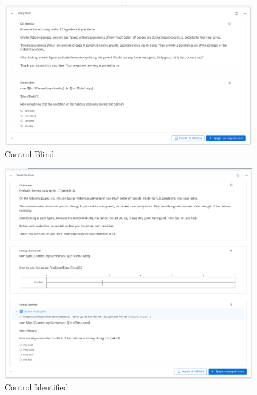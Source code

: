\documentclass[
]{article}
\begin{document}
\begin{figure}
\hypertarget{fig:label}{%
\centering
\includegraphics[width=1\textwidth,height=1\textheight]{control_blind.png}
\caption{Control Blind}\label{fig:label}
}
\end{figure}

\begin{figure}
\hypertarget{fig:label}{%
\centering
\includegraphics[width=1\textwidth,height=1\textheight]{control_identified.png}
\caption{Control Identified}\label{fig:label}
}
\end{figure}
\end{document}
